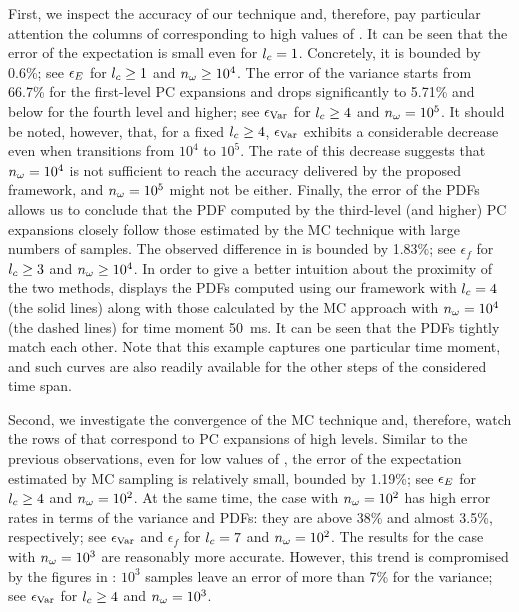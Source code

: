 First, we inspect the accuracy of our technique and, therefore, pay particular
attention the columns of  corresponding to high values
of \no. It can be seen that the error of the expectation is small even for ${l_{c}}
= 1$. Concretely, it is bounded by 0.6\%; see $\epsilon_{\expectation}$ for
${l_{c}} \geq 1$ and ${n_{\omega}} \geq 10^4$. The error of the variance starts from 66.7\%
for the first-level \ac{PC} expansions and drops significantly to 5.71\% and
below for the fourth level and higher; see $\epsilon_{\variance}$ for ${l_{c}} \geq
4$ and ${n_{\omega}} = 10^5$. It should be noted, however, that, for a fixed ${l_{c}} \geq
4$, $\epsilon_{\variance}$ exhibits a considerable decrease even when \no
transitions from $10^4$ to $10^5$. The rate of this decrease suggests that ${n_{\omega}}
= 10^4$ is not sufficient to reach the accuracy delivered by the proposed
framework, and ${n_{\omega}} = 10^5$ might not be either. Finally, the error of the
\acp{PDF} allows us to conclude that the \ac{PDF} computed by the third-level
(and higher) \ac{PC} expansions closely follow those estimated by the \ac{MC}
technique with large numbers of samples. The observed difference in
 is bounded by 1.83\%; see $\epsilon_f$ for ${l_{c}} \geq
3$ and ${n_{\omega}} \geq 10^4$. In order to give a better intuition about the proximity
of the two methods,  displays the \acp{PDF}
computed using our framework with ${l_{c}} = 4$ (the solid lines) along with those
calculated by the \ac{MC} approach with ${n_{\omega}} = 10^4$ (the dashed lines) for
time moment 50~ms. It can be seen that the \acp{PDF} tightly match each other.
Note that this example captures one particular time moment, and such curves are
also readily available for the other steps of the considered time span.

Second, we investigate the convergence of the \ac{MC} technique and, therefore,
watch the rows of  that correspond to \ac{PC}
expansions of high levels. Similar to the previous observations, even for low
values of \no, the error of the expectation estimated by \ac{MC} sampling is
relatively small, bounded by 1.19\%; see $\epsilon_{\expectation}$ for ${l_{c}}
\geq 4$ and ${n_{\omega}} = 10^2$. At the same time, the case with ${n_{\omega}} = 10^2$ has high
error rates in terms of the variance and \acp{PDF}: they are above 38\% and
almost 3.5\%, respectively; see $\epsilon_{\variance}$ and $\epsilon_f$ for
${l_{c}} = 7$ and ${n_{\omega}} = 10^2$. The results for the case with ${n_{\omega}} = 10^3$ are
reasonably more accurate. However, this trend is compromised by the figures in
: $10^3$ samples leave an error of more than 7\% for the
variance; see $\epsilon_{\variance}$ for ${l_{c}} \geq 4$ and ${n_{\omega}} = 10^3$.

